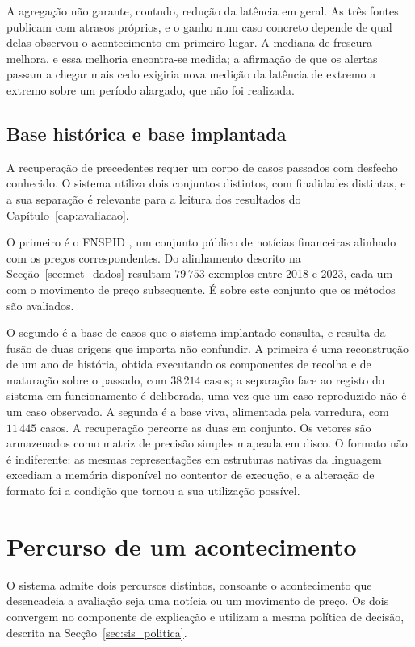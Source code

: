 A agregação não garante, contudo, redução da latência em geral. As três fontes publicam com
atrasos próprios, e o ganho num caso concreto depende de qual delas observou o acontecimento em
primeiro lugar. A mediana de frescura melhora, e essa melhoria encontra-se medida; a afirmação de
que os alertas passam a chegar mais cedo exigiria nova medição da latência de extremo a extremo
sobre um período alargado, que não foi realizada.

\subsection{Base histórica e base implantada}

A recuperação de precedentes requer um corpo de casos passados com desfecho conhecido. O sistema
utiliza dois conjuntos distintos, com finalidades distintas, e a sua separação é relevante para a
leitura dos resultados do Capítulo~\ref{cap:avaliacao}.

O primeiro é o \gls{FNSPID} \autocite{dong2024fnspid}, um conjunto público de notícias financeiras
alinhado com os preços correspondentes. Do alinhamento descrito na Secção~\ref{sec:met_dados}
resultam $79\,753$ exemplos entre 2018 e 2023, cada um com o movimento de preço subsequente. É
sobre este conjunto que os métodos são avaliados.

O segundo é a base de casos que o sistema implantado consulta, e resulta da fusão de duas origens
que importa não confundir. A primeira é uma reconstrução de um ano de história, obtida executando os
componentes de recolha e de maturação sobre o passado, com $38\,214$ casos; a separação face ao
registo do sistema em funcionamento é deliberada, uma vez que um caso reproduzido não é um caso
observado. A segunda é a base viva, alimentada pela varredura, com $11\,445$ casos. A recuperação
percorre as duas em conjunto. Os vetores são armazenados como matriz de precisão simples mapeada em disco. O
formato não é indiferente: as mesmas representações em estruturas nativas da linguagem excediam a
memória disponível no contentor de execução, e a alteração de formato foi a condição que tornou a
sua utilização possível.

\section{Percurso de um acontecimento}
\label{sec:sis_percurso}

O sistema admite dois percursos distintos, consoante o acontecimento que desencadeia a avaliação
seja uma notícia ou um movimento de preço. Os dois convergem no componente de explicação e
utilizam a mesma política de decisão, descrita na Secção~\ref{sec:sis_politica}.

